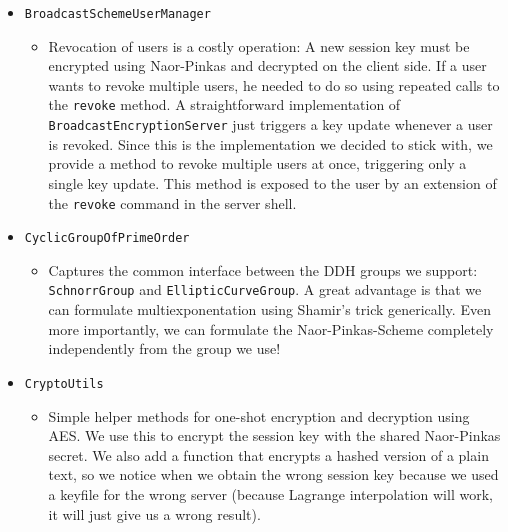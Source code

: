 \documentclass[a4paper,10pt]{scrartcl}
\begin{document}
\begin{itemize}
   \item \lstinline|BroadcastSchemeUserManager|
   \begin{itemize}
      \item Revocation of users is a costly operation: A new session key must be encrypted
     using Naor-Pinkas and decrypted on the client side. If a user wants to revoke multiple
     users, he needed to do so using repeated calls to the \lstinline|revoke| method.
     A straightforward implementation of \lstinline|BroadcastEncryptionServer| just triggers
     a key update whenever a user is revoked. Since this is the implementation we decided to
     stick with, we provide a method to revoke multiple users at once, triggering only
     a single key update. This method is exposed to the user by an extension of the \lstinline|revoke| command
     in the server shell.
  \end{itemize}

   \item \lstinline|CyclicGroupOfPrimeOrder|
  \begin{itemize}
    \item Captures the common interface between the DDH groups we support:
   \lstinline|SchnorrGroup| and \lstinline|EllipticCurveGroup|. A great advantage
   is that we can formulate multiexponentation using Shamir's trick generically. Even more importantly,
   we can formulate the Naor-Pinkas-Scheme completely independently from the group we use!
  \end{itemize}

   \item \lstinline|CryptoUtils|
  \begin{itemize}
   \item Simple helper methods for one-shot encryption and decryption using AES. We use this
   to encrypt the session key with the shared Naor-Pinkas secret. We also add a function that
   encrypts a hashed version of a plain text, so we notice when we obtain the wrong session
   key because we used a keyfile for the wrong server (because Lagrange interpolation will work,
   it will just give us a wrong result).
  \end{itemize}


\end{itemize}
\end{document}
